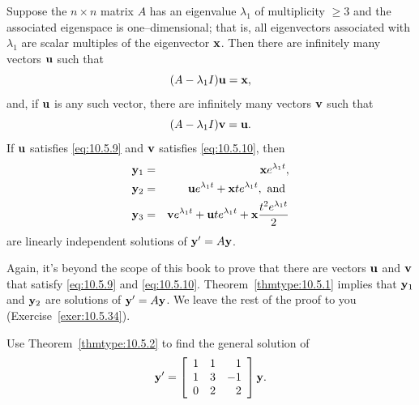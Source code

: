 \begin{theorem}
  \color{blue}
  \label{thmtype:10.5.2} Suppose the $n\times n$ matrix $A$ has an eigenvalue $\lambda_{1}$ of
  multiplicity $\ge3$ and the associated eigenspace is one--dimensional; that is, all eigenvectors
  associated with $\lambda_{1}$ are scalar multiples of the eigenvector ${\bf x}$. Then there are
  infinitely many vectors ${\bf u}$ such that
  \begin{equation}
    \label{eq:10.5.9}(A-\lambda_{1}I){\bf u}={\bf x},
  \end{equation}
  and, if ${\bf u}$ is any such vector, there are infinitely many vectors ${\bf v}$ such that
  \begin{equation}
    \label{eq:10.5.10}(A-\lambda_{1}I){\bf v}={\bf u}.
  \end{equation}
  If ${\bf u}$ satisfies {\rm\eqref{eq:10.5.9}} and ${\bf v}$ satisfies {\rm\eqref{eq:10.5.10}},
  then
  \begin{eqnarray*}
    {\bf y}_{1} & = & {\bf x}e^{\lambda_{1}t},                                      \\
    {\bf y}_{2} & = & {\bf u}e^{\lambda_{1}t}+{\bf x}te^{\lambda_{1}t},\mbox{ and } \\
    {\bf y}_{3} & = & {\bf v}e^{\lambda_{1}t}+{\bf u}te^{\lambda_{1}t}+{\bf x}{\frac{t^{2}e^{\lambda_{1}t}}{2}}
  \end{eqnarray*}
  are linearly independent solutions of ${\bf y}'=A{\bf y}$.
\end{theorem}

Again, it's beyond the scope of this book to prove that there are vectors ${\bf u}$ and ${\bf v}$
that satisfy \eqref{eq:10.5.9} and \eqref{eq:10.5.10}. Theorem~\ref{thmtype:10.5.1} implies that
${\bf y}_{1}$ and ${\bf y}_{2}$ are solutions of ${\bf y}'=A{\bf y}$. We leave the rest of the proof
to you (Exercise~\ref{exer:10.5.34}).

\begin{example}
  \label{example:10.5.4}\rm Use Theorem~\ref{thmtype:10.5.2} to find the general solution of
  \begin{equation}
    \label{eq:10.5.11}{\bf y}'=\left[\begin{array}{rrr} 1&1&1\\1&3&-1\\0&2&2\end{array}\right]{\bf y}.
  \end{equation}
\end{example}

